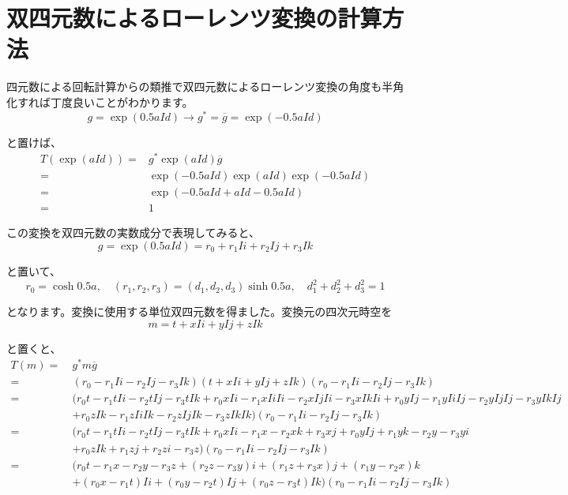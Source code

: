\documentclass[a4paper,12pt,notitlepage]{jsreport}
\begin{document}
\section{双四元数によるローレンツ変換の計算方法}

四元数による回転計算からの類推で双四元数によるローレンツ変換の角度も半角化すれば丁度良いことがわかります。
\begin{equation}
g=\exp(0.5aId) \to g^*=\overline{g}=\exp(-0.5aId)
\end{equation}

と置けば、
\begin{equation}
\begin{split}
T(\exp(aId))=&g^*\exp(aId)\overline{g}\\
=&\exp(-0.5aId)\exp(aId)\exp(-0.5aId)\\
=&\exp(-0.5aId+aId-0.5aId)\\
=&1
\end{split}
\end{equation}

この変換を双四元数の実数成分で表現してみると、
\begin{equation}
g=\exp(0.5aId)=r_0+r_1Ii+r_2Ij+r_3Ik
\end{equation}

と置いて、
\begin{equation}
r_0=\cosh 0.5a,\quad (r_1,r_2,r_3)=(d_1,d_2,d_3)\sinh 0.5a,\quad d_1^2+d_2^2+d_3^2=1
\end{equation}

となります。変換に使用する単位双四元数を得ました。変換元の四次元時空を
\begin{equation}
m=t+xIi+yIj+zIk
\end{equation}

と置くと、
\begin{equation}
\begin{split}
T(m)=~&g^*m\overline{g}\\
=~&(r_0-r_1Ii-r_2Ij-r_3Ik)(t+xIi+yIj+zIk)(r_0-r_1Ii-r_2Ij-r_3Ik)\\
=~&(r_0t-r_1tIi-r_2tIj-r_3tIk+r_0xIi-r_1xIiIi-r_2xIjIi-r_3xIkIi+r_0yIj-r_1yIiIj-r_2yIjIj-r_3yIkIj\\
&+r_0zIk-r_1zIiIk-r_2zIjIk-r_3zIkIk)(r_0-r_1Ii-r_2Ij-r_3Ik)\\
=~&(r_0t-r_1tIi-r_2tIj-r_3tIk+r_0xIi-r_1x-r_2xk+r_3xj+r_0yIj+r_1yk-r_2y-r_3yi\\
&+r_0zIk+r_1zj+r_2zi-r_3z)(r_0-r_1Ii-r_2Ij-r_3Ik)\\
=~&(r_0t-r_1x-r_2y-r_3z+(r_2z-r_3y)i+(r_1z+r_3x)j+(r_1y-r_2x)k\\
&+(r_0x-r_1t)Ii+(r_0y-r_2t)Ij+(r_0z-r_3t)Ik)(r_0-r_1Ii-r_2Ij-r_3Ik)\\
\end{split}
\end{equation}
\end{document}
